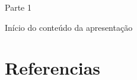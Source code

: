 \documentclass[aspectratio=169]{beamer} %
\begin{document}
{{\begin{frame}
\end{frame} 
}


{
\begin{frame}

\vspace*{3cm}
\hspace*{6.2cm}
\huge
Parte 1



\end{frame} 
}



{
\begin{frame}

\centering
Início do conteúdo da apresentação


\end{frame} 
}




\section{Referencias}

}
\end{document}
